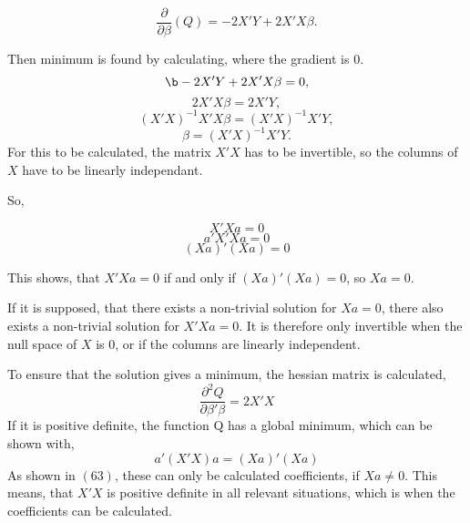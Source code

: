 \begin{equation}
\frac{\partial}{\partial \beta}(Q)=-2 X' Y + 2X' X \beta .
\end{equation}

\noindent Then minimum is found by calculating, where the gradient is 0.
\begin{equation}\b-2 X' Y+ 2X' X \beta =0,\end{equation}
\begin{equation} 2X' X \beta = 2X' Y,\end{equation}
\begin{equation}(X' X)^{-1} X' X \beta = (X' X)^{-1} X' Y,\end{equation}
\begin{equation} \beta=(X' X)^{-1} X' Y.\end{equation}
  For this to be calculated, the matrix $X' X$ has to be invertible, so the columns of $X$ have to be linearly independant.
 
 \noindent So, 
 
\begin{equation}
 	X' Xa  =0
\end{equation}
\begin{equation}
 	a' X' X a =0
\end{equation}
\begin{equation}
 	(Xa)'(Xa)=0
\end{equation}
 
 \noindent This shows, that $X'Xa=0$ if and only if $(Xa)'(Xa)=0$, so $Xa=0$. 
 
 \noindent If it is supposed, that there exists a non-trivial solution for $Xa=0$, there also exists a non-trivial solution for $X'Xa=0$. It is therefore only invertible when the null space of $X$ is 0, or if the columns are linearly independent. 
 
\noindent To ensure that the solution gives a minimum, the hessian matrix is calculated,
\begin{equation}
 \frac{\partial^2 Q}{\partial \beta' \beta}=2X'X
\end{equation} 
 \noindent If it is positive definite, the function Q has a global minimum, which can be shown with,
\begin{equation}
 a' (X' X)a = (Xa)' (Xa)
\end{equation}  
 \noindent As shown in $(63)$,
 these can only be calculated coefficients, if $Xa \not= 0$. This means, that $X'X$ is positive definite in all relevant situations, which is when the coefficients can be calculated. 
 
